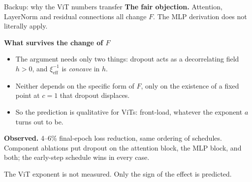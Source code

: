 \documentclass[aspectratio=169,10pt]{beamer}
\newcommand{\scope}[1]{{\footnotesize\color{caveat}#1}}
\begin{document}
\begin{frame}{Backup: why the ViT numbers transfer}
  \begingroup
  \small
  {\color{clay}\bfseries The fair objection.} Attention, LayerNorm and
  residual connections all change \(F\). The MLP derivation does not
  literally apply.

  \vspace{0.50em}
  {\color{forest}\bfseries What survives the change of \(F\)}
  \begin{itemize}
    \setlength{\itemsep}{0.30em}
    \item The argument needs only two things: dropout acts as a
      decorrelating field \(h>0\), and \(\xi_{\mathrm{eff}}^{-1}\) is
      \emph{concave} in \(h\).
    \item Neither depends on the specific form of \(F\), only on the
      existence of a fixed point at \(c=1\) that dropout displaces.
    \item So the prediction is qualitative for ViTs: front-load, whatever
      the exponent \(a\) turns out to be.
  \end{itemize}

  \vspace{0.50em}
  {\color{forest}\bfseries Observed.} 4--6\% final-epoch loss reduction,
  same ordering of schedules. Component ablations put dropout on the
  attention block, the MLP block, and both; the early-step schedule wins
  in every case.

  \vspace{0.40em}
  \scope{The ViT exponent is not measured. Only the sign of the effect is
  predicted.}
  \endgroup
\end{frame}
\end{document}
